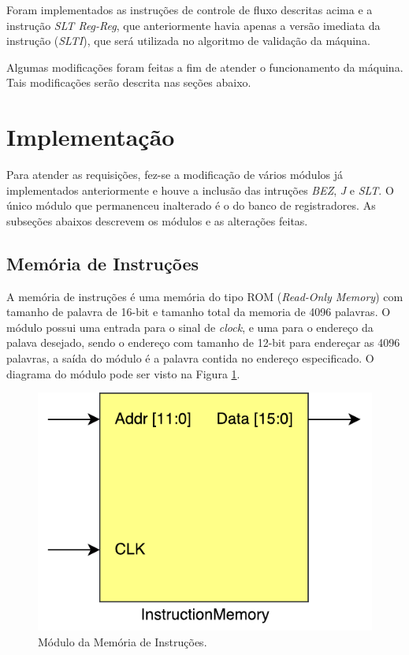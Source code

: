 \documentclass[11pt,a4paper,titlepage]{article}
\begin{document}
Foram implementados as instruções de controle de fluxo descritas acima e a instrução \textit{SLT Reg-Reg}, que anteriormente havia apenas a versão imediata da instrução (\textit{SLTI}), que será utilizada no algoritmo de validação da máquina.

Algumas modificações foram feitas a fim de atender o funcionamento da máquina. Tais modificações serão descrita nas seções abaixo.

\section{Implementação}

Para atender as requisições, fez-se a modificação de vários módulos já implementados anteriormente e houve a inclusão das intruções \textit{BEZ}, \textit{J} e \textit{SLT}. O único módulo que permanenceu inalterado é o do banco de registradores. As subseções abaixos descrevem os módulos e as alterações feitas.

\subsection{Memória de Instruções}\label{subsec:imp-instmemory}

A memória de instruções é uma memória do tipo ROM (\textit{Read-Only Memory}) com tamanho de palavra de 16-bit e tamanho total da memoria de 4096 palavras. O módulo possui uma entrada para o sinal de \textit{clock}, e uma para o endereço da palava desejado, sendo o endereço com tamanho de 12-bit para endereçar as 4096 palavras, a saída do módulo é a palavra contida no endereço especificado. O diagrama do módulo pode ser visto na Figura \ref{fig:instrmemory}.

\begin{figure}[!h]
\centering
\includegraphics[scale=0.5]{images/InstructionMemory.pdf}
\caption{Módulo da Memória de Instruções.}
\label{fig:instrmemory}
\end{figure}
\end{document}
